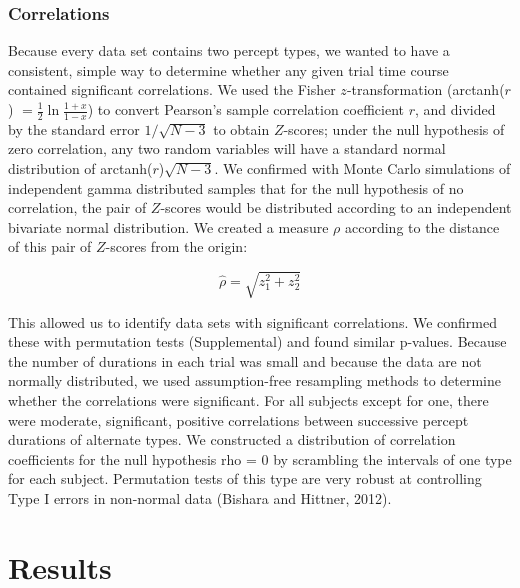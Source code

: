 \subsubsection{Correlations}

Because every data set contains two percept types, we wanted to have a consistent, simple way to determine whether any given trial time course contained significant correlations. We used the Fisher $z$-transformation (arctanh($r$) $ = \frac{1}{2} \ln \frac{1 + x} {1 - x}$) to convert Pearson's sample correlation coefficient $r$, and divided by the standard error $1/\sqrt{N-3}$ to obtain $Z$-scores; under the null hypothesis of zero correlation, any two random variables will have a standard normal distribution of arctanh($r$)$\sqrt{N-3}$.
We confirmed with Monte Carlo simulations of independent gamma distributed samples that for the null hypothesis of no correlation, the pair of $Z$-scores would be distributed according to an independent bivariate normal distribution. We created a measure $\rho$ according to the distance of this pair of $Z$-scores from the origin: 

\begin{equation}
\hat{\rho} = \sqrt{z_1^2 + z_2^2}
\end{equation}

This allowed us to identify data sets with significant correlations. We confirmed these with permutation tests (Supplemental) and found similar p-values. Because the number of durations in each trial was small and because the data are not normally distributed, we used assumption-free resampling methods to determine whether the correlations were significant. For all subjects except for one, there were moderate, significant, positive correlations between successive percept durations of alternate types. We constructed a distribution of correlation coefficients for the null hypothesis rho = 0 by scrambling the intervals of one type for each subject. Permutation tests of this type are very robust at controlling Type I errors in non-normal data (Bishara and Hittner, 2012). 


\section{Results}


